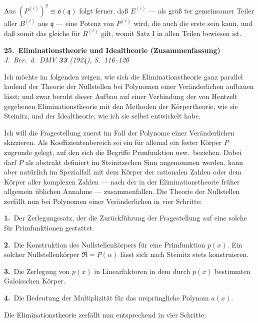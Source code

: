 \documentclass[12pt,a4paper]{article}
\begin{document}
{{Aus $(P^{(i)})^{\varrho}\equiv\mathfrak{o}(\mathfrak{q})$ folgt ferner, da{\ss} $E^{(i)}$ --- als gr\"{o}{\ss} ter gemeinsamer Teiler
aller $B^{(i)}$ aus $\mathfrak{q}$ --- eine Potenz von $P^{(i)}$ wird, die auch die erste sein
kann, und da{\ss} somit das gleiche f\"{u}r $R^{(i)}$ gilt, womit Satz I in allen
Teilen bewiesen ist.

\newpage
\begin{center}
\Large\textbf{25.\ Eliminationstheorie und Idealtheorie (Zusammenfassung)}
\\[0.5em]
\normalsize\textit{J.\ Ber.\ d.\ DMV \textbf{33} (1924), S.~116--120}
\end{center}

\medskip
Ich m\"{o}chte im folgenden zeigen, wie sich die Eliminationstheorie ganz
parallel laufend der Theorie der Nullstellen bei Polynomen einer
Ver\"{a}nderlichen aufbauen l\"{a}sst; und zwar beruht dieser Aufbau auf einer
Verbindung der von Hentzelt gegebenen Eliminationstheorie mit den
Methoden der K\"{o}rpertheorie, wie sie Steinitz, und der Idealtheorie, wie
ich sie selbst entwickelt habe.

Ich will die Fragestellung zuerst im Fall der Polynome einer Ver\"{a}nderlichen
skizzieren. Als Koeffizientenbereich sei ein f\"{u}r allemal ein fester
K\"{o}rper $P$ zugrunde gelegt, auf den sich die Begriffe Primfunktion usw.\ beziehen.
Dabei darf $P$ als abstrakt definiert im Steinitzschen Sinn angenommen
werden, kann aber nat\"{u}rlich im Spezialfall mit dem K\"{o}rper der
rationalen Zahlen oder dem K\"{o}rper aller komplexen Zahlen --- nach der
in der Eliminationstheorie fr\"{u}her allgemein \"{u}blichen Annahme --- zusammenfallen.
Die Theorie der Nullstellen zerf\"{a}llt nun bei Polynomen einer Ver\"{a}nderlichen
in vier Schritte:

\textbf{1.}\ Der Zerlegungssatz, der die Zur\"{u}ckf\"{u}hrung der Fragestellung
auf eine solche f\"{u}r Primfunktionen gestattet.

\textbf{2.}\ Die Konstruktion des Nullstellenk\"{o}rpers f\"{u}r eine Primfunktion $p(x)$.
Ein solcher Nullstellenk\"{o}rper $\mathfrak{R}=P(\alpha)$ l\"{a}sst sich nach Steinitz stets konstruieren.

\textbf{3.}\ Die Zerlegung von $p(x)$ in Linearfaktoren in dem durch $p(x)$
bestimmten Galoisschen K\"{o}rper.

\textbf{4.}\ Die Bedeutung der Multiplizit\"{a}t f\"{u}r das urspr\"{u}ngliche Polynom $a(x)$.

Die Eliminationstheorie zerf\"{a}llt nun entsprechend in vier Schritte:

}}
\end{document}
